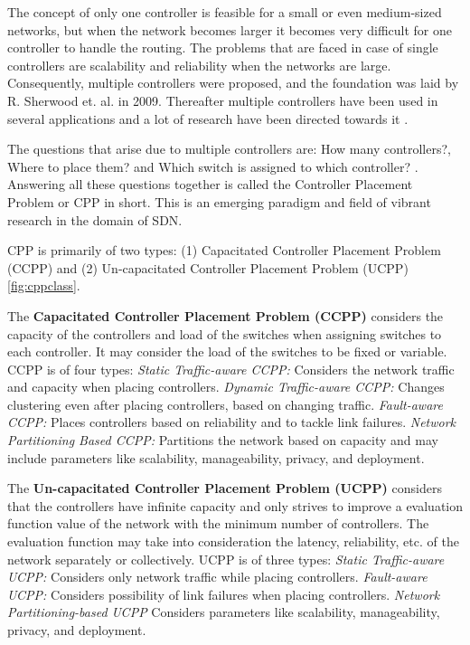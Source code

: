 \documentclass[a4paper,twocolumn,preprint]{elsarticle}
\begin{document}
The concept of only one controller is feasible for a small or even medium-sized networks, but when the network becomes larger it becomes very difficult for one controller to handle the routing. The problems that are faced in case of single controllers are scalability \cite{scalability2013dixit, scalability2013yeganeh} and reliability when the networks are large. Consequently, multiple controllers were proposed, and the foundation was laid by R. Sherwood et. al.\cite{flowvisor2009} in 2009.  Thereafter multiple controllers have been used in several applications \cite{whycpp2010, whycpp2013, whycpp2014} and a lot of research have been directed towards it \cite{cppsurvey2017, cppsurvey2018}.

The questions that arise due to multiple controllers are: How many controllers?, Where to place them? and Which switch is assigned to which controller? \cite{sdnwan2014, sdnlarge2015}. Answering all these questions together is called the Controller Placement Problem or CPP in short. This is an emerging paradigm and field of vibrant research in the domain of SDN.

CPP is primarily of two types\cite{cppsurvey2018}: (1) Capacitated Controller Placement Problem (CCPP) and (2) Un-capacitated Controller Placement Problem (UCPP) \ref{fig:cppclass}.

The \textbf{Capacitated Controller Placement Problem (CCPP)} considers the capacity of the controllers and load of the switches when assigning switches to each controller. It may consider the load of the switches to be fixed or variable. CCPP is of four types: \emph{Static Traffic-aware CCPP:} Considers the network traffic and capacity when placing controllers. \emph{Dynamic Traffic-aware CCPP:} Changes clustering even after placing controllers, based on changing traffic. \emph{Fault-aware CCPP:} Places controllers based on reliability and to tackle link failures. \emph{Network Partitioning Based CCPP:} Partitions the network based on capacity and may include parameters like scalability, manageability, privacy, and deployment.

The \textbf{Un-capacitated Controller Placement Problem (UCPP)} considers that the controllers have infinite capacity and only strives to improve a evaluation function value of the network with the minimum number of controllers. The evaluation function may take into consideration the latency, reliability, etc. of the network separately or collectively. UCPP is of three types: \emph{Static Traffic-aware UCPP:} Considers only network traffic while placing controllers. \emph{Fault-aware UCPP:} Considers possibility of link failures when placing controllers. \emph{Network Partitioning-based UCPP} Considers parameters like scalability, manageability, privacy, and deployment.
\end{document}

